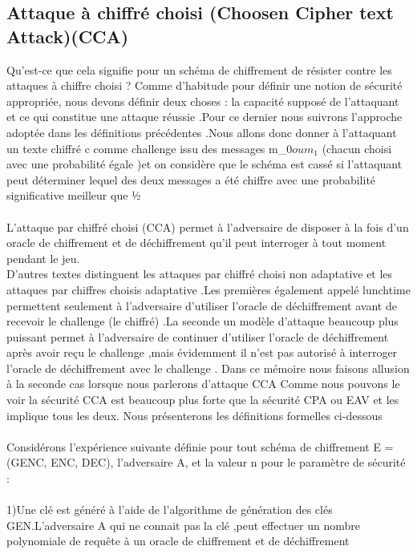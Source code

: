 \subsection{Attaque à chiffré choisi (Choosen Cipher text Attack)(CCA)}
Qu’est-ce que cela signifie pour un schéma de chiffrement de résister contre les attaques à chiffre choisi ?
Comme d’habitude pour définir  une notion de sécurité appropriée, nous devons définir deux choses : la capacité supposé de l’attaquant et ce qui constitue une attaque réussie .Pour ce dernier nous suivrons l’approche adoptée dans les définitions précédentes .Nous allons   donc donner à l’attaquant un texte chiffré c comme challenge issu des messages m{_0}$  ou m{_1}$ (chacun choisi avec une probabilité égale )et on considère que le schéma est cassé si l’attaquant peut déterminer lequel des deux messages a été chiffre avec une probabilité significative meilleur que ½
\\
\\
L’attaque par chiffré choisi (CCA) permet à l’adversaire de disposer à la fois d’un oracle de chiffrement et de déchiffrement qu’il peut interroger à tout moment pendant le jeu.\\
D’autres textes distinguent les attaques par chiffré choisi non adaptative  et les attaques par chiffres choisis adaptative .Les premières également appelé  lunchtime permettent seulement à l’adversaire d’utiliser l’oracle de déchiffrement  avant de recevoir le challenge (le chiffré) .La seconde un modèle d’attaque beaucoup  plus puissant  permet à l’adversaire de continuer d’utiliser l’oracle de déchiffrement après avoir reçu le challenge ,mais évidemment il n’est pas autorisé à  interroger l’oracle de déchiffrement avec le challenge .
Dans ce mémoire nous faisons allusion à la seconde cas lorsque nous parlerons d’attaque CCA
Comme nous pouvons le voir la sécurité CCA est beaucoup plus forte que la sécurité CPA ou EAV et les implique tous les deux. Nous présenterons les définitions formelles ci-dessous\\
\\
Considérons l'expérience suivante définie pour tout schéma de chiffrement E =
(GENC, ENC, DEC), l'adversaire A, et la valeur n pour le paramètre de sécurité :\\
\\
1)Une clé est généré à l’aide de l’algorithme de génération  des clés GEN.L’adversaire A qui ne connait pas la clé ,peut effectuer un nombre polynomiale de requête à un oracle de chiffrement et de  déchiffrement \\
